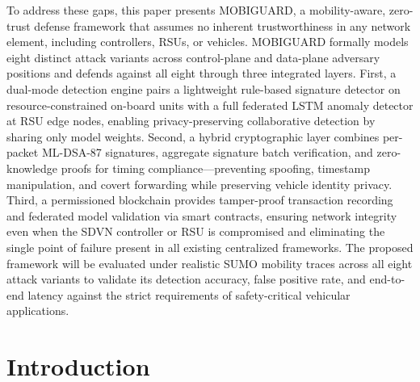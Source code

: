 \documentclass[12pt, a4paper]{report}
\begin{document}
To address these gaps, this paper presents MOBIGUARD, a mobility-aware,
zero-trust defense framework that assumes no inherent trustworthiness in
any network element, including controllers, RSUs, or vehicles. MOBIGUARD
formally models eight distinct attack variants across control-plane and
data-plane adversary positions and defends against all eight through three
integrated layers. First, a dual-mode detection engine pairs a lightweight
rule-based signature detector on resource-constrained on-board units with
a full federated LSTM anomaly detector at RSU edge nodes, enabling
privacy-preserving collaborative detection by sharing only model weights.
Second, a hybrid cryptographic layer combines per-packet ML-DSA-87 signatures,
aggregate signature batch verification, and zero-knowledge proofs for
timing compliance---preventing spoofing, timestamp manipulation, and covert
forwarding while preserving vehicle identity privacy. Third, a permissioned
blockchain provides tamper-proof transaction recording and federated model
validation via smart contracts, ensuring network integrity even when the
SDVN controller or RSU is compromised and eliminating the single point of
failure present in all existing centralized frameworks. 
The proposed framework will be evaluated under realistic SUMO mobility traces across all eight attack variants to validate its detection accuracy, false positive rate, and end-to-end latency against the strict requirements of safety-critical vehicular applications.


\tableofcontents
\newpage

\listoffigures
\newpage

\listoftables
\newpage

\acuseall %
\printacronyms
\newpage

\renewcommand{\thepage}{\arabic{page}} %
\setcounter{page}{1} %

\chapter{Introduction}
\end{document}
